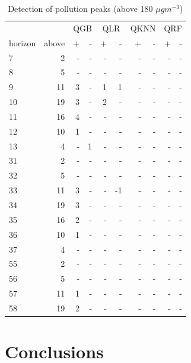 \documentclass[a4paper,twocolumn,5p]{elsarticle}
\begin{document}
\begin{table}[tbp]
  \centering
  \caption{
    Detection of \no pollution peaks (above 180 $\mu gm^{-3}$)
    \label{table:classif_hig}
  }
  \begin{tabular}{lr|rr|rr|rr|rr}
    \toprule 
    \multicolumn{2}{c}{} & \multicolumn{2}{c}{QGB} & \multicolumn{2}{c}{QLR} & \multicolumn{2}{c}{QKNN} & \multicolumn{2}{c}{QRF}   \\
    horizon &  above &  + &  - &  + &  - &  + &  - &  + &  - \\
    \midrule
    7  & 2 &- &   - &- &   - & - &    - &- &   - \\
    8  & 5 &- &   - &- &   - & - &    - &- &   - \\
    9  &11 & 3 &   - & 1 &   1 & - &    - &- &   - \\
    10 &19 & 3 &   - & 2 &   - & - &    - &- &   - \\
    11 &16 & 4 &   - &- &   - & - &    - &- &   - \\
    12 &10 & 1 &   - &- &   - & - &    - &- &   - \\
    13 & 4 &- &   1 &- &   - & - &    - &- &   - \\
    31 & 2 &- &   - &- &   - & - &    - &- &   - \\
    32 & 5 &- &   - &- &   - & - &    - &- &   - \\
    33 &11 & 3 &   - &- &   -1 & - &    - &- &   - \\
    34 &19 & 3 &   - &- &   - & - &    - &- &   - \\
    35 &16 & 2 &   - &- &   - & - &    - &- &   - \\
    36 &10 & 1 &   - &- &   - & - &    - &- &   - \\
    37 & 4 &- &   - &- &   - & - &    - &- &   - \\
    55 & 2 &- &   - &- &   - & - &    - &- &   - \\
    56 & 5 &- &   - &- &   - & - &    - &- &   - \\
    57 &11 & 1 &   - &- &   - & - &    - &- &   - \\
    58 &19 & 2 &   - &- &   - & - &    - &- &   - \\
    \bottomrule
    \end{tabular}
\end{table}

\section{Conclusions}
\label{sec:concl}
\end{document}
